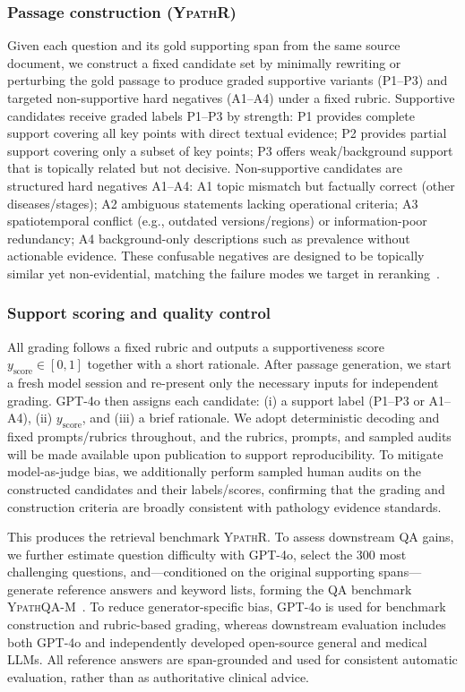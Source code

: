 \documentclass[preprint,12pt,a4paper]{elsarticle}
\begin{document}
\subsubsection{Passage construction (\textsc{YpathR})}
Given each question and its gold supporting span from the same source document, we construct a fixed candidate set by minimally rewriting or perturbing the gold passage to produce graded supportive variants (P1--P3) and targeted non-supportive hard negatives (A1--A4) under a fixed rubric.
Supportive candidates receive graded labels \textsc{P1--P3} by strength:
\textsc{P1} provides complete support covering all key points with direct textual evidence;
\textsc{P2} provides partial support covering only a subset of key points;
\textsc{P3} offers weak/background support that is topically related but not decisive.
Non-supportive candidates are structured hard negatives \textsc{A1--A4}:
\textsc{A1} topic mismatch but factually correct (other diseases/stages);
\textsc{A2} ambiguous statements lacking operational criteria;
\textsc{A3} spatiotemporal conflict (e.g., outdated versions/regions) or information-poor redundancy;
\textsc{A4} background-only descriptions such as prevalence without actionable evidence.
These confusable negatives are designed to be topically similar yet non-evidential, matching the failure modes we target in reranking~\cite{karpukhin2020dpr,xiong2021ance}.

\subsubsection{Support scoring and quality control}
All grading follows a fixed rubric and outputs a supportiveness score $y_{\text{score}}\in[0,1]$ together with a short rationale.
After passage generation, we start a fresh model session and re-present only the necessary inputs for independent grading.
GPT-4o then assigns each candidate: (i) a support label (\textsc{P1--P3} or \textsc{A1--A4}), (ii) $y_{\text{score}}$, and (iii) a brief rationale.
We adopt deterministic decoding and fixed prompts/rubrics throughout, and the rubrics, prompts, and sampled audits will be made available upon publication to support reproducibility.
To mitigate model-as-judge bias, we additionally perform sampled human audits on the constructed candidates and their labels/scores, confirming that the grading and construction criteria are broadly consistent with pathology evidence standards.

This produces the retrieval benchmark \textsc{YpathR}.
To assess downstream QA gains, we further estimate question difficulty with GPT-4o, select the 300 most challenging questions, and---conditioned on the original supporting spans---generate reference answers and keyword lists, forming the QA benchmark \textsc{YpathQA-M}~\cite{guu2020realm,wang2022selfinstruct}.
To reduce generator-specific bias, GPT-4o is used for benchmark construction and rubric-based grading, whereas downstream evaluation includes both GPT-4o and independently developed open-source general and medical LLMs.
All reference answers are span-grounded and used for consistent automatic evaluation, rather than as authoritative clinical advice.
\end{document}
